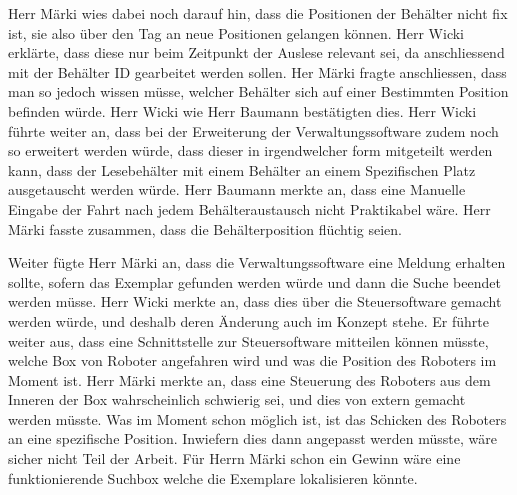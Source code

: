 \documentclass[parskip=full, a4paper]{scrreprt}
\begin{document}
Herr Märki wies dabei noch darauf hin, dass die Positionen der Behälter nicht fix ist, sie also über den Tag an neue Positionen gelangen können. Herr Wicki erklärte, dass diese nur beim Zeitpunkt der Auslese relevant sei, da anschliessend mit der Behälter ID gearbeitet werden sollen.
Her Märki fragte anschliessen, dass man so jedoch wissen müsse, welcher Behälter sich auf einer Bestimmten Position befinden würde. Herr Wicki wie Herr Baumann bestätigten dies.
Herr Wicki führte weiter an, dass bei der Erweiterung der Verwaltungssoftware zudem noch so erweitert werden würde, dass dieser in irgendwelcher form mitgeteilt werden kann, dass der Lesebehälter mit einem Behälter an einem Spezifischen Platz ausgetauscht werden würde. Herr Baumann merkte an, dass eine Manuelle Eingabe der Fahrt nach jedem Behälteraustausch nicht Praktikabel wäre. Herr Märki fasste zusammen, dass die Behälterposition flüchtig seien.

Weiter fügte Herr Märki an, dass die Verwaltungssoftware eine Meldung erhalten sollte, sofern das Exemplar gefunden werden würde und dann die Suche beendet werden müsse. Herr Wicki merkte an, dass dies über die Steuersoftware gemacht werden würde, und deshalb deren Änderung auch im Konzept stehe. Er führte weiter aus, dass eine Schnittstelle zur Steuersoftware mitteilen können müsste, welche Box von Roboter angefahren wird und was die Position des Roboters im Moment ist. Herr Märki merkte an, dass eine Steuerung des Roboters aus dem Inneren der Box wahrscheinlich schwierig sei, und dies von extern gemacht werden müsste. Was im Moment schon möglich ist, ist das Schicken des Roboters an eine spezifische Position. Inwiefern dies dann angepasst werden müsste, wäre sicher nicht Teil der Arbeit. Für Herrn Märki schon ein Gewinn wäre eine funktionierende Suchbox welche die Exemplare lokalisieren könnte.
\end{document}

